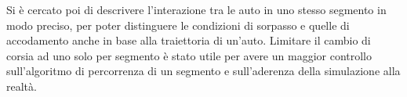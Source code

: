 Si è cercato poi di descrivere l'interazione tra le auto in uno stesso segmento in modo preciso, per poter distinguere le condizioni di sorpasso e quelle di accodamento anche in base alla traiettoria di un'auto. Limitare il cambio di corsia ad uno solo per segmento è stato utile per avere un maggior controllo sull'algoritmo di percorrenza di un segmento e sull'aderenza della simulazione alla realtà.
